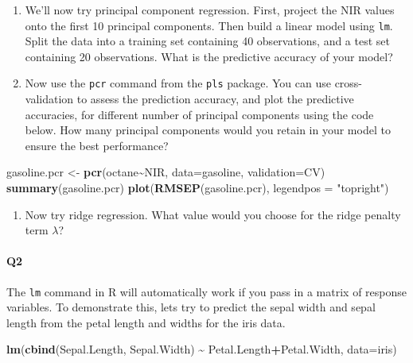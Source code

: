 \documentclass[
]{book}
\newenvironment{Shaded}{\begin{snugshade}}{\end{snugshade}}
\newcommand{\AttributeTok}[1]{\textcolor[rgb]{0.13,0.29,0.53}{#1}}
\newcommand{\FunctionTok}[1]{\textcolor[rgb]{0.13,0.29,0.53}{\textbf{#1}}}
\newcommand{\NormalTok}[1]{#1}
\newcommand{\OtherTok}[1]{\textcolor[rgb]{0.56,0.35,0.01}{#1}}
\newcommand{\SpecialCharTok}[1]{\textcolor[rgb]{0.81,0.36,0.00}{\textbf{#1}}}
\newcommand{\StringTok}[1]{\textcolor[rgb]{0.31,0.60,0.02}{#1}}
\providecommand{\tightlist}{%
  \setlength{\itemsep}{0pt}\setlength{\parskip}{0pt}}
\theoremstyle{definition}
\theoremstyle{definition}
\theoremstyle{definition}
\theoremstyle{definition}
\theoremstyle{remark}
\begin{document}
\begin{enumerate}
\def\labelenumi{\roman{enumi}.}
\setcounter{enumi}{1}
\item
  We'll now try principal component regression. First, project the NIR values onto the first 10 principal components. Then build a linear model using \texttt{lm}. Split the data into a training set containing 40 observations, and a test set containing 20 observations. What is the predictive accuracy of your model?
\item
  Now use the \texttt{pcr} command from the \texttt{pls} package. You can use cross-validation to assess the prediction accuracy, and plot the predictive accuracies, for different number of principal components using the code below.
  How many principal components would you retain in your model to ensure the best performance?
\end{enumerate}

\begin{Shaded}
\begin{Highlighting}[]
\NormalTok{gasoline.pcr }\OtherTok{\textless{}{-}} \FunctionTok{pcr}\NormalTok{(octane}\SpecialCharTok{\textasciitilde{}}\NormalTok{NIR, }\AttributeTok{data=}\NormalTok{gasoline, }\AttributeTok{validation=}\StringTok{\textquotesingle{}CV\textquotesingle{}}\NormalTok{)}
\FunctionTok{summary}\NormalTok{(gasoline.pcr)}
\FunctionTok{plot}\NormalTok{(}\FunctionTok{RMSEP}\NormalTok{(gasoline.pcr), }\AttributeTok{legendpos =} \StringTok{"topright"}\NormalTok{)}
\end{Highlighting}
\end{Shaded}

\begin{enumerate}
\def\labelenumi{\roman{enumi}.}
\setcounter{enumi}{3}
\tightlist
\item
  Now try ridge regression. What value would you choose for the ridge penalty term \(\lambda\)?
\end{enumerate}

\hypertarget{q2-1}{%
\paragraph*{Q2}\label{q2-1}}

The \texttt{lm} command in R will automatically work if you pass in a matrix of response variables. To demonstrate this, lets try to predict the sepal width and sepal length from the petal length and widths for the iris data.

\begin{Shaded}
\begin{Highlighting}[]
\FunctionTok{lm}\NormalTok{(}\FunctionTok{cbind}\NormalTok{(Sepal.Length, Sepal.Width) }\SpecialCharTok{\textasciitilde{}}\NormalTok{ Petal.Length}\SpecialCharTok{+}\NormalTok{Petal.Width,}
   \AttributeTok{data=}\NormalTok{iris)}
\end{Highlighting}
\end{Shaded}
\end{document}
